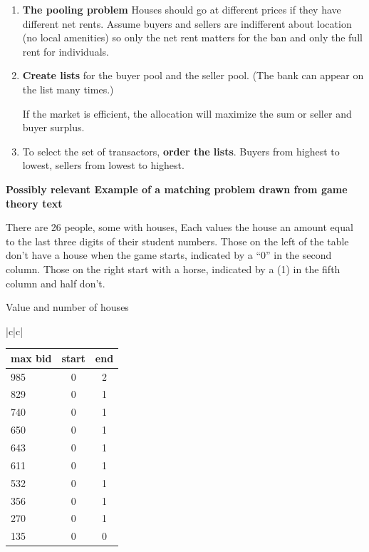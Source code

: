 {{\begin{enumerate}
\item \textbf{The pooling problem}  Houses should go at different prices if they have different net rents.  Assume buyers and sellers are indifferent about location (no  local amenities) so only the net rent matters for the ban and only the full rent for individuals.

\item \textbf{Create lists} for the buyer pool and the seller pool. (The bank can appear on the list many times.) 

If the market is efficient, the allocation will maximize the sum or seller and buyer surplus.

\item To select the set of transactors, \textbf{order the lists}. Buyers from highest to lowest, sellers from lowest to highest.

\end{enumerate}



\newpage
\textbf{Possibly relevant Example of a matching problem drawn from game theory text}

There are 26  people, some with houses, Each values the house an amount equal to the last three digits of their student numbers. Those on the left of the table don't have a house when the game starts, indicated by a ``0'' in the second column. Those on the right  start with a horse, indicated by a  (1) in the fifth column and half don't. 

\begin{center}
Value and number of houses

\begin{tabular}{|c|c|}
 
\begin{tabular}{lcc}
max bid&start&end  \\ \hline
985  & 0 & 2 \\
829  & 0 & 1 \\
740  & 0 & 1 \\
650  & 0 & 1 \\
643  & 0 & 1 \\
611  & 0 & 1 \\\hline
532  & 0 & \color{red}1  \\
356  & 0 & \color{red} 1   \\
270  & 0 & \color{red} 1  \\
135  & 0 & 0    \\%
   

\end{tabular}
\end{tabular}
\end{center}}}
